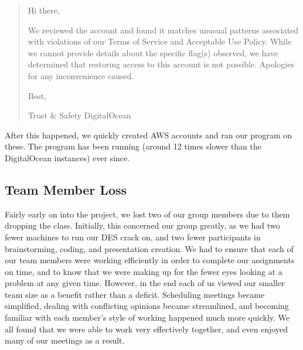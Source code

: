 \documentclass{article}
\begin{document}
\begin{quote}
Hi there,

We reviewed the account and found it matches unusual patterns associated with violations of our Terms of Service and Acceptable Use Policy. While we cannot provide details about the specific flag(s) observed, we have determined that restoring access to this account is not possible. Apologies for any inconvenience caused.

Best,

Trust \& Safety
DigitalOcean
\end{quote}

After this happened, we quickly created AWS accounts and ran our program on these. The program has been running (around 12 times slower than the DigitalOcean instances) ever since. 

\subsection{Team Member Loss}
Fairly early on into the project, we lost two of our group members due to them dropping the class. Initially, this concerned our group greatly, as we had two fewer machines to run our DES crack on, and two fewer participants in brainstorming, coding, and presentation creation. We had to ensure that each of our team members were working efficiently in order to complete our assignments on time, and to know that we were making up for the fewer eyes looking at a problem at any given time. However, in the end each of us viewed our smaller team size as a benefit rather than a deficit. Scheduling meetings became simplified, dealing with conflicting opinions became streamlined, and becoming familiar with each member's style of working happened much more quickly. We all found that we were able to work very effectively together, and even enjoyed many of our meetings as a result.
\end{document}
